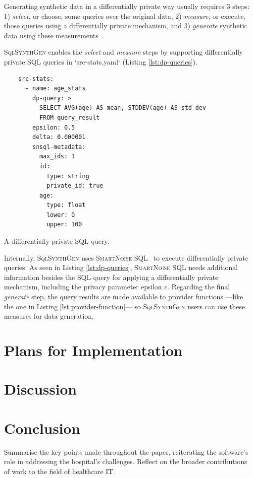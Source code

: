 \documentclass[11pt]{article}
\begin{document}
Generating synthetic data in a differentially private way usually requires 3 steps: 1) \emph{select}, or choose, some queries over the original data, 2) \emph{measure}, or execute, those queries using a differentially private mechanism, and 3) \emph{generate} synthetic data using these measurements~\cite{DBLP:journals/pvldb/McKennaMSM22}.

\textsc{SqlSynthGen} enables the \emph{select} and \emph{measure} steps by supporting differentially private SQL queries in `src-stats.yaml`  (Listing \ref{lst:dp-queries}).

\begin{listing}[H]
\begin{verbatim}
    src-stats:
      - name: age_stats
        dp-query: >
          SELECT AVG(age) AS mean, STDDEV(age) AS std_dev
          FROM query_result
        epsilon: 0.5
        delta: 0.000001
        snsql-metadata:
          max_ids: 1
          id:
            type: string
            private_id: true
          age:
            type: float
            lower: 0
            upper: 100
\end{verbatim}
\caption{A differentially-private SQL query. }
\label{lst:dp-queries}
\end{listing}

Internally, \textsc{SqlSynthGen} uses \textsc{SmartNoise SQL}~\cite{allen2020opendp} to execute differentially private queries.
As seen in Listing \ref{lst:dp-queries}, \textsc{SmartNoise SQL} needs additional information besides the SQL query for applying a differentially private mechanism, including the privacy parameter epsilon $\varepsilon$.
Regarding the final \emph{generate} step, the query results are made available to provider functions ---like the one in Listing \ref{lst:provider-function}--- so \textsc{SqlSynthGen} users can use these measures for data generation. 

\section{Plans for Implementation}


\section{Discussion}

\section{Conclusion}
Summarise the key points made throughout the paper, reiterating the software's role in addressing the hospital's challenges.
Reflect on the broader contributions of work to the field of healthcare IT.



\end{document}
